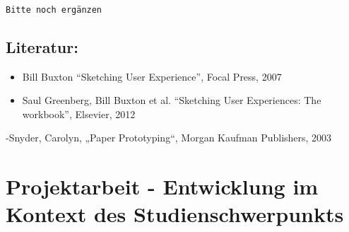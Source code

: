 \begin{verbatim}

Bitte noch ergänzen
\end{verbatim}

\section*{Literatur:}\label{literatur-13}

\begin{itemize}
\item
  Bill Buxton ``Sketching User Experience'', Focal Press, 2007
\item
  Saul Greenberg, Bill Buxton et al. ``Sketching User Experiences: The
  workbook'', Elsevier, 2012
\end{itemize}

-Snyder, Carolyn, „Paper Prototyping``, Morgan Kaufman Publishers, 2003

\chapter{Projektarbeit - Entwicklung im Kontext des
Studienschwerpunkts}\label{projektarbeit---entwicklung-im-kontext-des-studienschwerpunkts}

